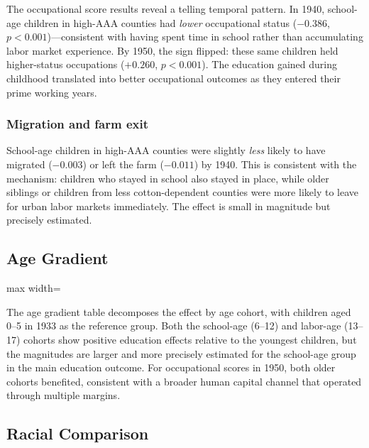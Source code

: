 \documentclass[12pt]{article}
\begin{document}
The occupational score results reveal a telling temporal pattern. In 1940, school-age children in high-AAA counties had \textit{lower} occupational status ($-0.386$, $p < 0.001$)---consistent with having spent time in school rather than accumulating labor market experience. By 1950, the sign flipped: these same children held higher-status occupations ($+0.260$, $p < 0.001$). The education gained during childhood translated into better occupational outcomes as they entered their prime working years.

\subsubsection*{Migration and farm exit} School-age children in high-AAA counties were slightly \textit{less} likely to have migrated ($-0.003$) or left the farm ($-0.011$) by 1940. This is consistent with the mechanism: children who stayed in school also stayed in place, while older siblings or children from less cotton-dependent counties were more likely to leave for urban labor markets immediately. The effect is small in magnitude but precisely estimated.

\subsection{Age Gradient}

\begin{table}[H]
\caption{Age Gradient: Three Cohort Interactions}\label{tab:age_gradient}
\begin{adjustbox}{max width=\textwidth}

\end{adjustbox}
\end{table}

The age gradient table decomposes the effect by age cohort, with children aged 0--5 in 1933 as the reference group. Both the school-age (6--12) and labor-age (13--17) cohorts show positive education effects relative to the youngest children, but the magnitudes are larger and more precisely estimated for the school-age group in the main education outcome. For occupational scores in 1950, both older cohorts benefited, consistent with a broader human capital channel that operated through multiple margins.

\subsection{Racial Comparison}
\end{document}
